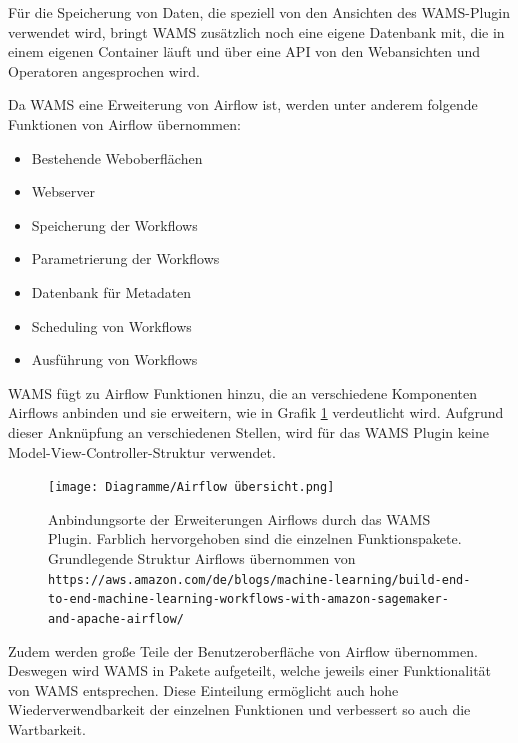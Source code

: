 Für die Speicherung von Daten, die speziell von den Ansichten des WAMS-Plugin verwendet wird, bringt WAMS zusätzlich noch eine eigene Datenbank mit, die in einem eigenen Container läuft und über eine API von den Webansichten und Operatoren angesprochen wird.


Da WAMS eine Erweiterung von Airflow ist, werden unter anderem folgende Funktionen von Airflow übernommen:
\begin{itemize}
    \item Bestehende Weboberflächen
    \item Webserver
    \item Speicherung der Workflows
    \item Parametrierung der Workflows
    \item Datenbank für Metadaten
    \item Scheduling von Workflows
    \item Ausführung von Workflows
\end{itemize}
WAMS fügt zu Airflow Funktionen hinzu, die an verschiedene Komponenten Airflows anbinden und sie erweitern, wie in Grafik  \ref{fig:airflowÜbersicht} verdeutlicht wird. Aufgrund dieser Anknüpfung an verschiedenen Stellen, wird für das WAMS Plugin keine Model-View-Controller-Struktur verwendet.

\begin{figure}[H]
    \texttt{[image: Diagramme/Airflow übersicht.png]}
    \caption{Anbindungsorte der Erweiterungen Airflows durch das WAMS Plugin. Farblich hervorgehoben sind die einzelnen Funktionspakete.\\ \tiny{Grundlegende Struktur Airflows übernommen von \nolinkurl{https://aws.amazon.com/de/blogs/machine-learning/build-end-to-end-machine-learning-workflows-with-amazon-sagemaker-and-apache-airflow/}}}
    \label{fig:airflowÜbersicht}
\end{figure}

Zudem werden große Teile der Benutzeroberfläche von Airflow übernommen. 
Deswegen wird WAMS in Pakete aufgeteilt, welche jeweils einer Funktionalität von WAMS entsprechen. Diese Einteilung ermöglicht auch hohe Wiederverwendbarkeit der einzelnen Funktionen und verbessert so auch die Wartbarkeit.

